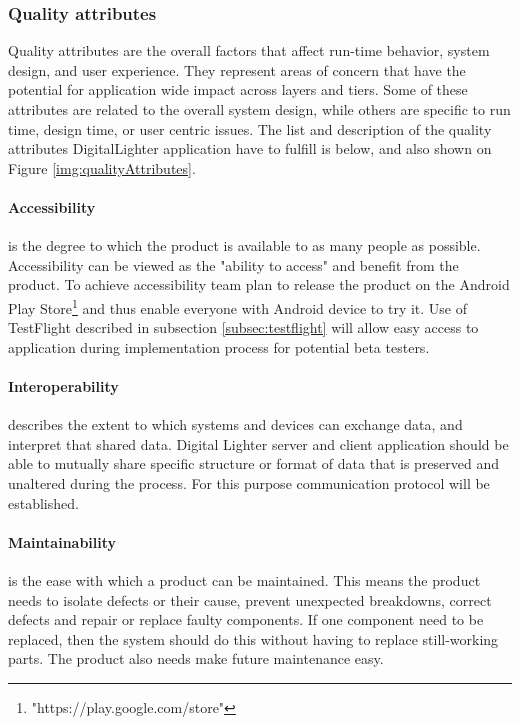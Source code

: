 \subsubsection{Quality attributes}
\label{sec:quality_attributes}
Quality attributes are the overall factors that affect run-time behavior, system design, and user experience. They represent areas of concern that have the potential for application wide impact across layers and tiers. Some of these attributes are related to the overall system design, while others are specific to run time, design time, or user centric issues. The list and description of the quality attributes DigitalLighter application have to fulfill is below, and also shown on Figure \ref{img:qualityAttributes}.

\paragraph{Accessibility}
is the degree to which the product is available to as many people as possible. 
Accessibility can be viewed as the "ability to access" and benefit from the product. 
To achieve accessibility team plan to release the product on the Android Play Store\footnote{"https://play.google.com/store"} and thus enable everyone with Android device to try it. Use of TestFlight described in subsection \ref{subsec:testflight} will allow easy access to application during implementation process for potential beta testers.

\paragraph{Interoperability}
describes the extent to which systems and devices can exchange data, and interpret that shared data. Digital Lighter server and client application should be able to mutually share specific structure or format of data that is preserved and unaltered during the process. For this purpose communication protocol will be established.

\paragraph{Maintainability}
is the ease with which a product can be maintained. This means the product needs to isolate defects or their cause, prevent unexpected breakdowns, correct defects and repair or replace faulty components. If one component need to be replaced, then the system should do this without having to replace still-working parts. The product also needs make future maintenance easy. 


